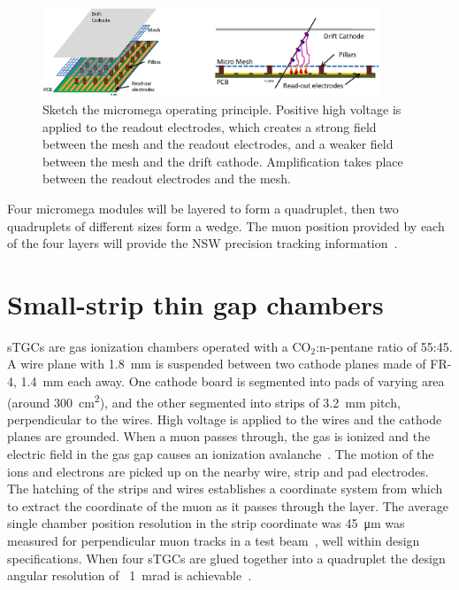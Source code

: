 \begin{figure}
    \centering
    \includegraphics[width = 0.9\textwidth]{figures/micromegas.png}
    \caption{Sketch the micromega operating principle. Positive high voltage is applied to the readout electrodes, which creates a strong field between the mesh and the readout electrodes, and a weaker field between the mesh and the drift cathode. Amplification takes place between the readout electrodes and the mesh. }
    \label{fig:micromega}
\end{figure}

Four micromega modules will be layered to form a quadruplet, then two quadruplets of different sizes form a wedge. The muon position provided by each of the four layers will provide the NSW precision tracking information~\cite{nsw_tdr}.

\section{Small-strip thin gap chambers}

sTGCs are gas ionization chambers operated with a CO$_2$:n-pentane ratio of 55:45. A wire plane with \SI{1.8}{mm} is suspended between two cathode planes made of FR-4, \SI{1.4}{mm} each away. One cathode board is segmented into pads of varying area (around \SI{300}{cm^2}), and the other segmented into strips of \SI{3.2}{mm} pitch, perpendicular to the wires. High voltage is applied to the wires and the cathode planes are grounded. When a muon passes through, the gas is ionized and the electric field in the gas gap causes an ionization avalanche~\cite{townsend_electricity_1915}. The motion of the ions and electrons are picked up on the nearby wire, strip and pad electrodes. The hatching of the strips and wires establishes a coordinate system from which to extract the coordinate of the muon as it passes through the layer. The average single chamber position resolution in the strip coordinate was \SI{45}{\micro\meter} was measured for perpendicular muon tracks in a test beam~\cite{abusleme_performance_2016}, well within design specifications. When four sTGCs are glued together into a quadruplet the design angular resolution of ~\SI{1}{mrad} is achievable~\cite{nsw_tdr, perez-codina_small-strip_2016}.

